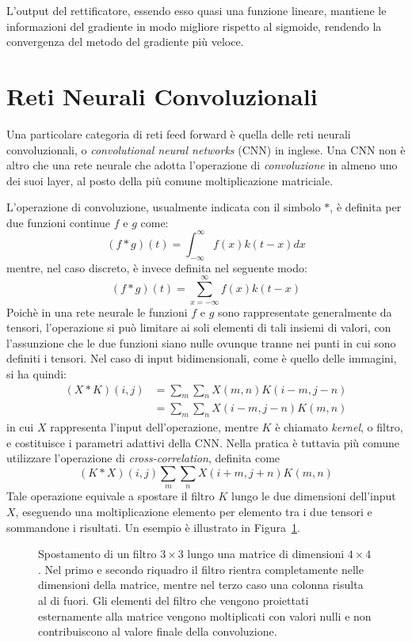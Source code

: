 L'output del rettificatore, essendo esso quasi una funzione lineare, mantiene
le informazioni del gradiente in modo migliore rispetto al sigmoide,
rendendo la convergenza del metodo del gradiente più veloce.
\section{Reti Neurali Convoluzionali}
Una particolare categoria di reti feed forward è quella delle reti neurali
convoluzionali, o \emph{convolutional neural networks} (CNN) in inglese. Una
CNN non è altro che una rete neurale che adotta l'operazione di
\emph{convoluzione} in almeno uno dei suoi layer, al posto della più comune
moltiplicazione matriciale.

L'operazione di convoluzione, usualmente indicata con il simbolo $*$, è
definita per due funzioni continue $f$ e $g$ come:
\[
(f * g)(t) = \int_{-\infty}^\infty{f(x)k(t - x)dx}
\]
mentre, nel caso discreto, è invece definita nel seguente modo:
\[
(f * g)(t) = \sum_{x = -\infty}^\infty{f(x)k(t - x)}
\]
Poichè in una rete neurale le funzioni $f$ e $g$ sono rappresentate
generalmente da tensori, l'operazione si può limitare ai soli elementi di tali
insiemi di valori, con l'assunzione che le due funzioni siano nulle ovunque
tranne nei punti in cui sono definiti i tensori. Nel caso di input
bidimensionali, come è quello delle immagini, si ha quindi:
\begin{align*}
(X * K)(i,j) &= \sum_m{\sum_n{X(m,n) K(i - m, j - n)}} \\
             &= \sum_m{\sum_n{X(i - m, j - n) K(m, n)}}
\end{align*}
in cui $X$ rappresenta l'input dell'operazione, mentre $K$ è chiamato
\emph{kernel}, o filtro, e costituisce i parametri adattivi della CNN\@. Nella
pratica è tuttavia più comune utilizzare l'operazione di
\emph{cross-correlation}, definita come
\[ (K * X)(i, j) \sum_m{\sum_n{X(i + m, j + n) K(m, n)}} \]
Tale operazione equivale a spostare il filtro $K$ lungo le due dimensioni
dell'input $X$, eseguendo una moltiplicazione elemento per elemento tra i due
tensori e sommandone i risultati. Un esempio è illustrato in
Figura~\ref{fig:conv}.
\begin{figure}[!htp]
  \caption{%
    Spostamento di un filtro $3\times3$ lungo una matrice di dimensioni
    $4\times4$. Nel primo e secondo riquadro il filtro rientra completamente
    nelle dimensioni della matrice, mentre nel terzo caso una colonna risulta
    al di fuori. Gli elementi del filtro che vengono proiettati esternamente
    alla matrice vengono moltiplicati con valori nulli e non contribuiscono al
    valore finale della convoluzione.
  }%
  \label{fig:conv}
\end{figure}
